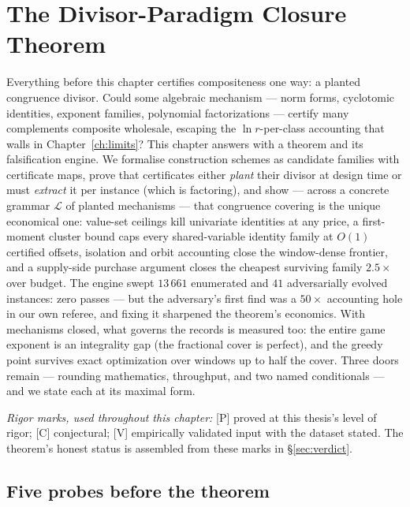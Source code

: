 \chapter{The Divisor-Paradigm Closure Theorem}
\label{ch:closure}

\begin{chapterabstract}
Everything before this chapter certifies compositeness one way: a
planted congruence divisor. Could some algebraic mechanism --- norm
forms, cyclotomic identities, exponent families, polynomial
factorizations --- certify many complements composite wholesale,
escaping the $\ln r$-per-class accounting that walls in
Chapter~\ref{ch:limits}? This chapter answers with a theorem and its
falsification engine. We formalise construction schemes as
candidate families with certificate maps, prove that certificates
either \emph{plant} their divisor at design time or must
\emph{extract} it per instance (which is factoring), and show --- across
a concrete grammar $\mathcal L$ of planted mechanisms --- that
congruence covering is the unique economical one: value-set ceilings
kill univariate identities at any price, a first-moment cluster bound
caps every shared-variable identity family at $O(1)$ certified offsets,
isolation and orbit accounting close the window-dense frontier, and a
supply-side purchase argument closes the cheapest surviving family
$2.5\times$ over budget. The engine swept $13\,661$ enumerated and $41$
adversarially evolved instances: zero passes --- but the adversary's
first find was a $50\times$ accounting hole in our own referee, and
fixing it sharpened the theorem's economics. With mechanisms closed,
what governs the records is measured too: the entire game exponent is
an integrality gap (the fractional cover is perfect), and the greedy
point survives exact optimization over windows up to half the cover.
Three doors remain --- rounding mathematics, throughput, and two named
conditionals --- and we state each at its maximal form.
\end{chapterabstract}

\noindent\emph{Rigor marks, used throughout this chapter:} [P] proved at
this thesis's level of rigor; [C] conjectural; [V] empirically
validated input with the dataset stated. The theorem's honest status is
assembled from these marks in \S\ref{sec:verdict}.

\section{Five probes before the theorem}\label{sec:probes}


